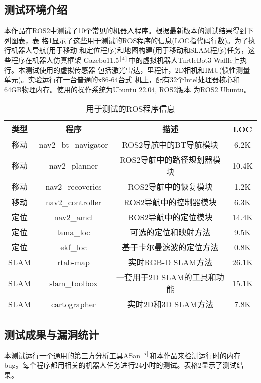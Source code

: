 \subsection{测试环境介绍}
本作品在ROS2中测试了10个常见的机器人程序。根据最新版本的测试结果得到下列图表，表
格1显示了这些用于测试的ROS程序的信息(LOC指代码行数)。为了执行机器人导航(用于移动
和定位程序)和地图构建(用于移动和SLAM程序)任务，这些程序在机器人仿真框架
Gazebo11.5$^{[4]}$中的虚拟机器人TurtleBot3 Waffle上执行。本测试使用的虚拟传感器
包括激光雷达，里程计，2D相机和IMU(惯性测量单元)。实验运行在一台普通的x86-64台式
机上，配有32个Intel处理器核心和64GB物理内存。使用的操作系统为Ubuntu 22.04, ROS2版本
为ROS2 Ubuntu。
\begin{table}[H]
	\small
	\caption{用于测试的ROS程序信息}
	\label{tb:ros_test}
	\centering
	\begin{tabular}{cccc}
		\hline  
		\textbf{类型} & \textbf{程序} & \textbf{描述} & \textbf{LOC} \\ 
		\hline  
		移动 & nav2\_bt\_navigator & ROS2导航中的BT导航模块 & 6.2K \\
		移动 & nav2\_planner & ROS2导航中的路径规划器模块 & 10.4K \\
		移动 & nav2\_recoveries & ROS2导航中的恢复模块 & 1.2K \\
		移动 & nav2\_controller & ROS2导航中的控制器模块 & 6.3K \\
		定位 & nav2\_amcl & ROS2导航中的定位模块 & 14.4K \\
		定位 & lama\_loc & 可选的定位和映射方法 & 9.5K \\
		定位 & ekf\_loc & 基于卡尔曼滤波的定位方法 & 0.8K \\
		SLAM & rtab-map & 实时RGB-D SLAM方法 & 26.1K \\
		SLAM & slam\_toolbox & 一套用于2D SLAM的工具和功能 & 15.1K \\
		SLAM & cartographer & 实时2D和3D SLAM方法 & 7.8K \\
		\hline
	\end{tabular} 
\end{table}

\subsection{测试成果与漏洞统计}
本测试运行一个通用的第三方分析工具ASan$^{[5]}$和本作品来检测运行时的内存bug。每个程序都用相关的机器人任务进行24小时的测试。表格2显示了测试结果。

